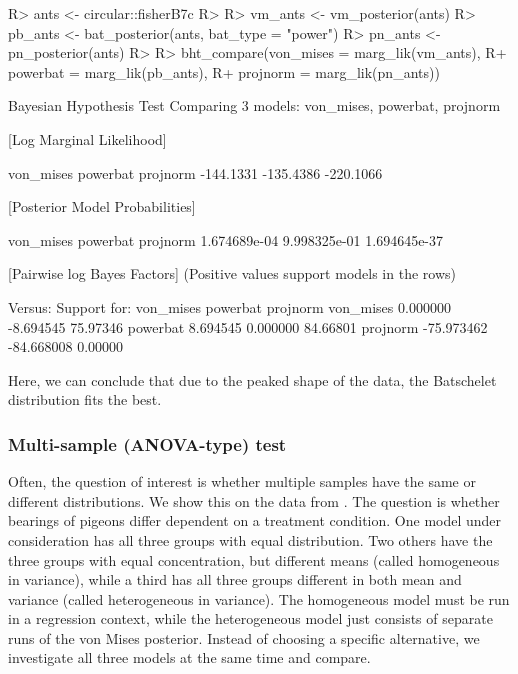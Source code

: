 \begin{CodeChunk}

\begin{CodeInput}
R> ants <- circular::fisherB7c
R> 
R> vm_ants <- vm_posterior(ants)
R> pb_ants <- bat_posterior(ants, bat_type = "power")
R> pn_ants <- pn_posterior(ants)
R> 
R> bht_compare(von_mises = marg_lik(vm_ants), 
R+             powerbat  = marg_lik(pb_ants), 
R+             projnorm  = marg_lik(pn_ants))
\end{CodeInput}

\begin{CodeOutput}
Bayesian Hypothesis Test
    Comparing 3 models: von_mises, powerbat, projnorm

[Log Marginal Likelihood]

von_mises  powerbat  projnorm 
-144.1331 -135.4386 -220.1066 


[Posterior Model Probabilities]

   von_mises     powerbat     projnorm 
1.674689e-04 9.998325e-01 1.694645e-37 


[Pairwise log Bayes Factors]
  (Positive values support models in the rows)

               Versus: 
Support for:     von_mises   powerbat projnorm
      von_mises   0.000000  -8.694545 75.97346
      powerbat    8.694545   0.000000 84.66801
      projnorm  -75.973462 -84.668008  0.00000
\end{CodeOutput}
\end{CodeChunk}

Here, we can conclude that due to the peaked shape of the data, the
Batschelet distribution fits the best.

\hypertarget{multi-sample-anova-type-test}{%
\subsubsection{Multi-sample (ANOVA-type)
test}\label{multi-sample-anova-type-test}}

Often, the question of interest is whether multiple samples have the
same or different distributions. We show this on the  data
\citep{gagliardo2008navigational, fisher1995statistical} from
. The question is whether bearings of pigeons differ
dependent on a treatment condition. One model under consideration has
all three groups with equal distribution. Two others have the three
groups with equal concentration, but different means (called homogeneous
in variance), while a third has all three groups different in both mean
and variance (called heterogeneous in variance). The homogeneous model
must be run in a regression context, while the heterogeneous model just
consists of separate runs of the von Mises posterior. Instead of
choosing a specific alternative, we investigate all three models at the
same time and compare.

